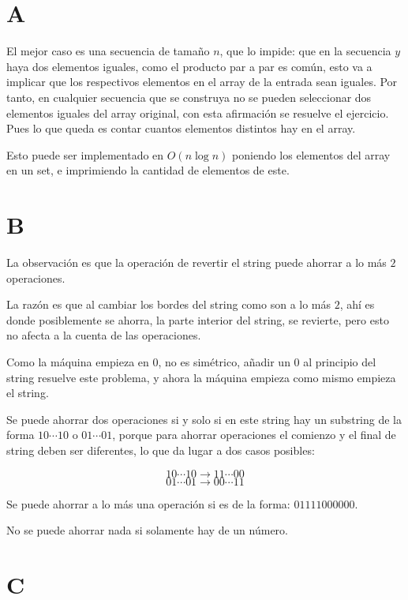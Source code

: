 \documentclass[14pt]{extarticle}
\begin{document}
\tableofcontents

\section{A}

El mejor caso es una secuencia de tamaño $n$, que lo impide: que en la secuencia $y$ haya dos elementos iguales, como el producto par a par es común, esto va a implicar que los respectivos elementos en el array de la entrada sean iguales. Por tanto, en cualquier secuencia que se construya no se pueden seleccionar dos elementos iguales del array original, con esta afirmación se resuelve el ejercicio. Pues lo que queda es contar cuantos elementos distintos hay en el array.

Esto puede ser implementado en $O(n \log n)$ poniendo los elementos del array en un set, e imprimiendo la cantidad de elementos de este.

\section{B}

La observación es que la operación de revertir el string puede ahorrar a lo más $2$ operaciones.

La razón es que al cambiar los bordes del string como son a lo más $2$, ahí es donde posiblemente se ahorra, la parte interior del string, se revierte, pero esto no afecta a la cuenta de las operaciones.

Como la máquina empieza en $0$, no es simétrico, añadir un $0$ al principio del string resuelve este problema, y ahora la máquina empieza como mismo empieza el string.

Se puede ahorrar dos operaciones si y solo si en este string hay un substring de la forma $10 \cdots 10$ o $01 \cdots 01$, porque para ahorrar operaciones el comienzo y el final de string deben ser diferentes, lo que da lugar a dos casos posibles: 

$$10 \cdots 10 \rightarrow 11 \cdots 00$$
$$01\cdots01 \rightarrow 00\cdots11$$

Se puede ahorrar a lo más una operación si es de la forma: $01111000000$.

No se puede ahorrar nada si solamente hay de un número.

\section{C}
\end{document}
